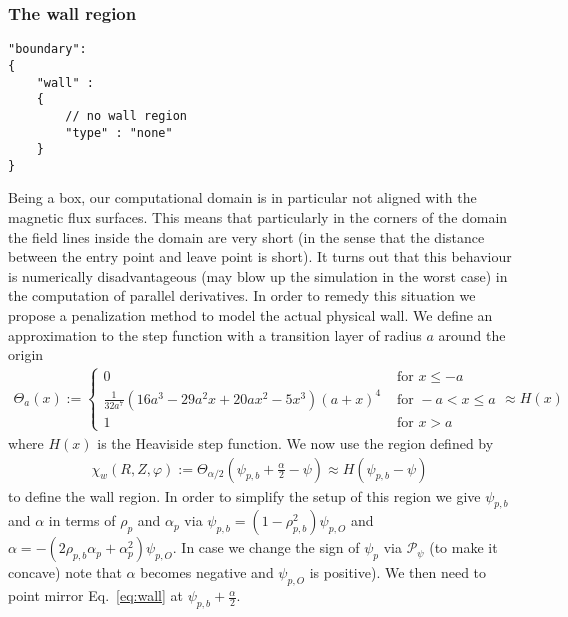 \subsubsection{The wall region}
\begin{verbatim}
"boundary":
{
    "wall" :
    {
        // no wall region
        "type" : "none"
    }
}
\end{verbatim}
Being a box, our computational domain is in particular not aligned with the
magnetic flux surfaces. This means that particularly in the corners of
the domain the field lines inside the domain are very short (in the
sense that the distance between the entry point and leave point is short).
It turns out that this behaviour is numerically disadvantageous (may
blow up the simulation in the worst case) in the
computation of parallel derivatives.
In order to remedy this situation
we propose a penalization method to model the actual physical wall.
We define an approximation to the step function with a transition layer of radius $a$
around the origin
\begin{align}
\Theta_a(x) := \begin{cases}
    0 & \text{ for } x \leq -a  \\
    \frac{1}{32 a^7}  \left(16 a^3-29 a^2 x+20 a x^2-5 x^3\right) (a+x)^4
    &\text{ for } -a<x\leq a \\
    1 & \text{ for } x > a
\end{cases}
    \approx H(x)
\label{eq:approx_heaviside}
\end{align}
where $H(x)$ is the Heaviside step function.
%
We now use the region defined by
\begin{align}\label{eq:wall}
    \chi_w(R,Z,\varphi):=\Theta_{\alpha/2}\left(\psi_{p,b} + \frac{\alpha}{2} - \psi \right) \approx H(\psi_{p,b}-\psi)
\end{align}
to define the wall region.
In order to simplify the setup of this region we give $\psi_{p,b}$ and $\alpha$ in terms of
$\rho_p$ and $\alpha_p$ via $\psi_{p,b} = (1-\rho_{p,b}^2)\psi_{p,O}$ and $\alpha = -(2\rho_{p,b} \alpha_p + \alpha_p^2)\psi_{p,O}$. In case we change the sign
of $\psi_p$ via $\mathcal P_\psi$ (to make it concave) note that $\alpha$ becomes
negative and $\psi_{p,O}$ is positive).
We then need to point mirror Eq.~\eqref{eq:wall} at $\psi_{p,b}+\frac{\alpha}{2}$.

